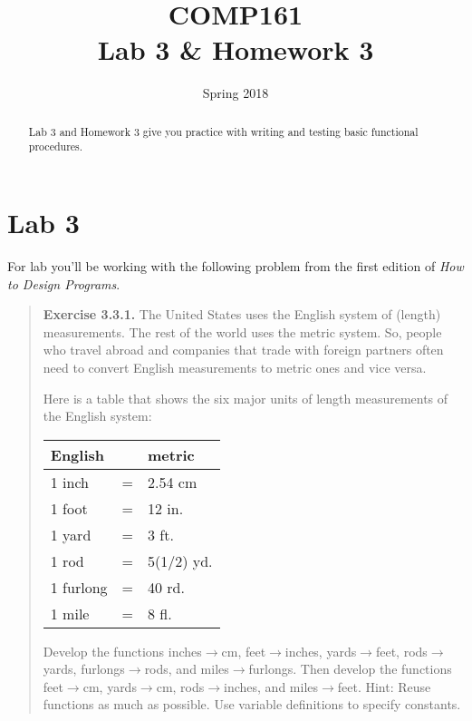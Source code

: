 \documentclass[]{tufte-handout}
\title{COMP161 \\ Lab 3 \& Homework 3}
\author{}
\date{Spring 2018}
\begin{document}
\maketitle

\begin{abstract}
Lab 3 and Homework 3 give you practice with writing and testing basic functional procedures.
\end{abstract}

\section{Lab 3}

For lab you'll be working with the following problem from the first edition of \textit{How to Design Programs}.
\begin{framed}
\begin{quote}
\textbf{Exercise 3.3.1.}   The United States uses the English system of (length) measurements. The rest of the world uses the metric system. So, people who travel abroad and companies that trade with foreign partners often need to convert English measurements to metric ones and vice versa.

Here is a table that shows the six major units of length measurements of the English system:


\begin{center}
\begin{tabular}{lcl}
English & &  metric \\ \toprule
1 inch	&=&	2.54	cm \\
1 foot	&=&	12	in. \\
1 yard	&=&	3	ft. \\
1 rod	&=&	5(1/2)	yd.\\
1 furlong	&=&	40	rd.\\
1 mile	&=&	8	fl.
\end{tabular}
\end{center}

Develop the functions inches$\rightarrow$cm, feet$\rightarrow$inches, yards$\rightarrow$feet, rods$\rightarrow$yards, furlongs$\rightarrow$rods, and miles$\rightarrow$furlongs.
Then develop the functions feet$\rightarrow$cm, yards$\rightarrow$cm, rods$\rightarrow$inches, and miles$\rightarrow$feet.
Hint: Reuse functions as much as possible. Use variable definitions to specify constants.
\end{quote}
\end{framed}
\end{document}
